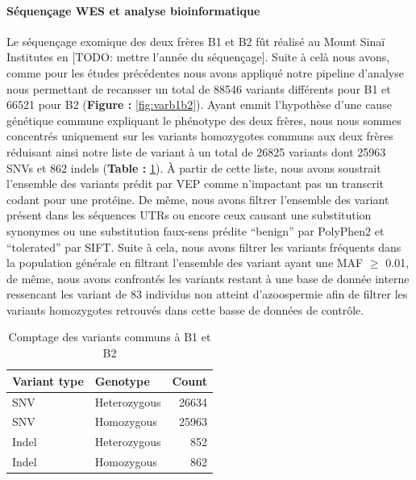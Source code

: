 \documentclass[12pt,twoside]{reedthesis}
\theoremstyle{definition}
\theoremstyle{definition}
\theoremstyle{remark}
\begin{document}
  \paragraph{Séquençage WES et analyse
  bioinformatique}\label{sequencage-wes-et-analyse-bioinformatique}
  
  Le séquençage exomique des deux frères B1 et B2 fût réalisé au Mount
  Sinaï Institutes en {[}TODO: mettre l'année du séquençage{]}. Suite à
  celà nous avons, comme pour les études précédentes nous avons appliqué
  notre pipeline d'analyse nous permettant de recansser un total de 88546
  variants différents pour B1 et 66521 pour B2 (\textbf{Figure :
  }\ref{fig:varb1b2}). Ayant emmit l'hypothèse d'une cause génétique
  commune expliquant le phénotype des deux frères, nous nous sommes
  concentrés uniquement sur les variants homozygotes communs aux deux
  frères réduisant ainsi notre liste de variant à un total de 26825
  variants dont 25963 SNVs et 862 indels (\textbf{Table :
  }\ref{tab:tabcommonvar}). À partir de cette liste, nous avons soustrait
  l'ensemble des variants prédit par VEP comme n'impactant pas un
  transcrit codant pour une protéine. De même, nous avons filtrer
  l'ensemble des variant présent dans les séquences UTRs ou encore ceux
  causant une substitution synonymes ou une substitution faux-sens prédite
  ``benign'' par PolyPhen2 et ``tolerated'' par SIFT. Suite à cela, nous
  avons filtrer les variants fréquents dans la population générale en
  filtrant l'ensemble des variant ayant une MAF \(\ge\) 0.01, de même,
  nous avons confrontés les variants restant à une base de donnée interne
  ressencant les variant de 83 individus non atteint d'azoospermie afin de
  filtrer les variants homozygotes retrouvés dans cette basse de données
  de contrôle.
  
  \begin{table}
  
  \caption{\label{tab:tabcommonvar}Comptage des variants communs à B1 et B2}
  \centering
  \begin{tabular}[t]{l|l|r}
  \hline
  Variant type & Genotype & Count\\
  \hline
  SNV & Heterozygous & 26634\\
  \hline
  SNV & Homozygous & 25963\\
  \hline
  Indel & Heterozygous & 852\\
  \hline
  Indel & Homozygous & 862\\
  \hline
  \end{tabular}
  \end{table}
  
\end{document}
